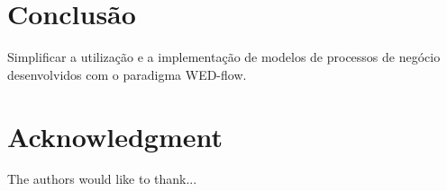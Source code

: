 \documentclass[conference]{IEEEtran}
\begin{document}
\section{Conclusão}
Simplificar a utilização e a implementação de modelos de processos de negócio desenvolvidos com o paradigma WED-flow.






%



\section*{Acknowledgment}


The authors would like to thank...


\ifCLASSOPTIONcaptionsoff
  \newpage
\fi



\end{document}
